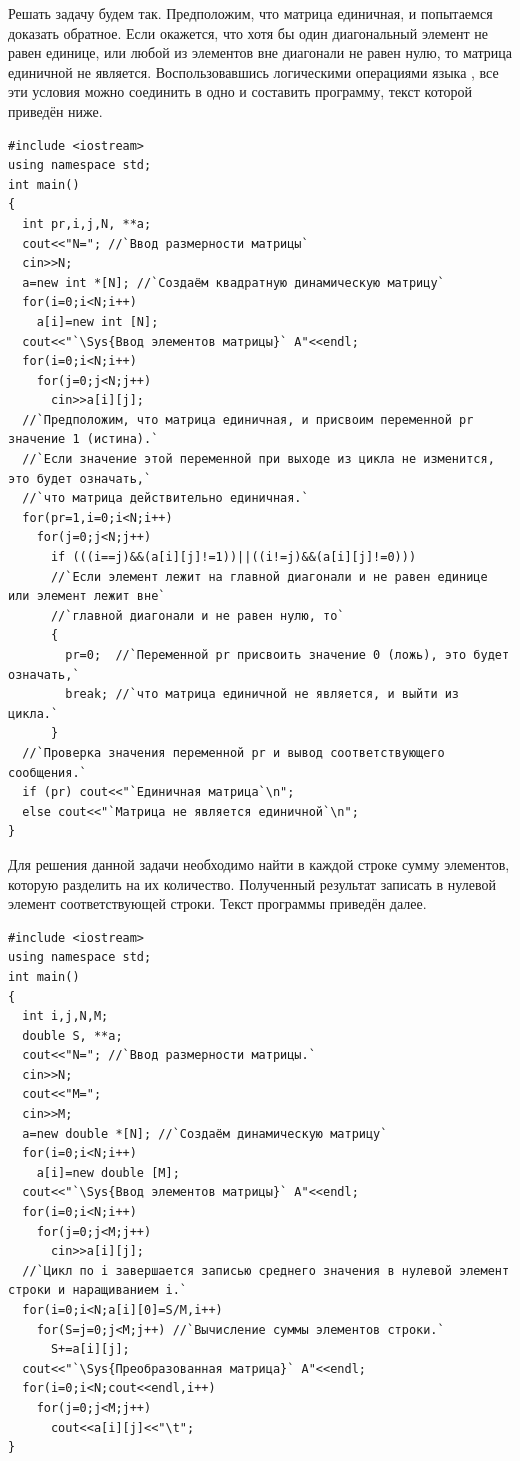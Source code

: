 Решать задачу будем так. Предположим, что матрица единичная, и попытаемся доказать обратное. Если окажется, что хотя бы
один диагональный элемент не равен единице, или любой из элементов вне диагонали не равен нулю, то матрица единичной не
является. 
Воспользовавшись логическими операциями языка , все эти условия можно соединить 
в одно и составить программу, текст которой приведён ниже.
\begin{lstlisting}
#include <iostream>
using namespace std;
int main()
{
  int pr,i,j,N, **a; 
  cout<<"N="; //`Ввод размерности матрицы`
  cin>>N;
  a=new int *[N]; //`Создаём квадратную динамическую матрицу`
  for(i=0;i<N;i++)
    a[i]=new int [N];
  cout<<"`\Sys{Ввод элементов матрицы}` A"<<endl;
  for(i=0;i<N;i++)
    for(j=0;j<N;j++)
      cin>>a[i][j];
  //`Предположим, что матрица единичная, и присвоим переменной pr значение 1 (истина).` 
  //`Если значение этой переменной при выходе из цикла не изменится, это будет означать,` 
  //`что матрица действительно единичная.`
  for(pr=1,i=0;i<N;i++)
    for(j=0;j<N;j++)
      if (((i==j)&&(a[i][j]!=1))||((i!=j)&&(a[i][j]!=0)))
      //`Если элемент лежит на главной диагонали и не равен единице или элемент лежит вне` 
      //`главной диагонали и не равен нулю, то` 
      {
        pr=0;  //`Переменной pr присвоить значение 0 (ложь), это будет означать,`
        break; //`что матрица единичной не является, и выйти из цикла.`
      }
  //`Проверка значения переменной pr и вывод соответствующего сообщения.` 
  if (pr) cout<<"`Единичная матрица`\n";
  else cout<<"`Матрица не является единичной`\n";
}
\end{lstlisting}


Для решения данной задачи необходимо найти в каждой строке сумму элементов, которую разделить на их количество.
Полученный результат записать в нулевой элемент соответствующей строки. Текст программы приведён далее.
\begin{lstlisting}
#include <iostream>
using namespace std;
int main()
{
  int i,j,N,M;
  double S, **a;
  cout<<"N="; //`Ввод размерности матрицы.`
  cin>>N;
  cout<<"M=";
  cin>>M;
  a=new double *[N]; //`Создаём динамическую матрицу`
  for(i=0;i<N;i++)
    a[i]=new double [M];
  cout<<"`\Sys{Ввод элементов матрицы}` A"<<endl;
  for(i=0;i<N;i++)
    for(j=0;j<M;j++)
      cin>>a[i][j];
  //`Цикл по i завершается записью среднего значения в нулевой элемент строки и наращиванием i.`
  for(i=0;i<N;a[i][0]=S/M,i++)
    for(S=j=0;j<M;j++) //`Вычисление суммы элементов строки.`
      S+=a[i][j];
  cout<<"`\Sys{Преобразованная матрица}` A"<<endl;
  for(i=0;i<N;cout<<endl,i++)
    for(j=0;j<M;j++)
      cout<<a[i][j]<<"\t";
}
\end{lstlisting}

